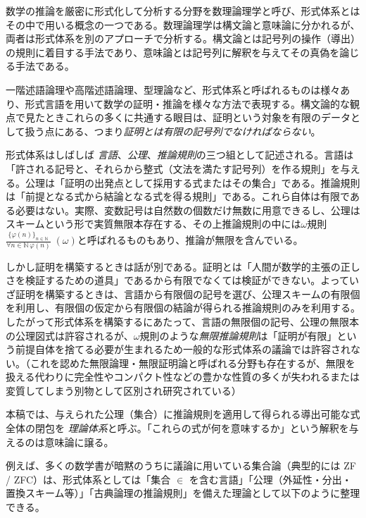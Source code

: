 \documentclass[a4paper,12pt]{bxjsbook}
\newlength{\customindent}
\newenvironment{body}{
  \par
  \begingroup
  \setlength{\leftskip}{\customindent}
  \setlength{\rightskip}{0pt}
  \setlength{\parindent}{1em}
  \setlength{\displayindent}{\customindent}
  \setlength{\displaywidth}{\dimexpr\linewidth-\customindent\relax}
}{
  \par
  \endgroup
}
\theoremstyle{theorem}
\begin{document}
    \begin{body}
        \indent 数学の推論を厳密に形式化して分析する分野を数理論理学と呼び、形式体系とはその中で用いる概念の一つである。数理論理学は構文論と意味論に分かれるが、両者は形式体系を別のアプローチで分析する。構文論とは記号列の操作（導出）の規則に着目する手法であり、意味論とは記号列に解釈を与えてその真偽を論じる手法である。

        \indent 一階述語論理や高階述語論理、型理論など、形式体系と呼ばれるものは様々あり、形式言語を用いて数学の証明・推論を様々な方法で表現する。構文論的な観点で見たときこれらの多くに共通する眼目は、証明という対象を有限のデータとして扱う点にある、つまり\emph{証明とは有限の記号列でなければならない}。
    
        \indent 形式体系はしばしば \emph{言語}、\emph{公理}、\emph{推論規則}の三つ組として記述される。言語は「許される記号と、それらから整式（文法を満たす記号列）を作る規則」を与える。公理は「証明の出発点として採用する式またはその集合」である。推論規則は「前提となる式から結論となる式を得る規則」である。これら自体は有限である必要はない。実際、変数記号は自然数の個数だけ無数に用意できるし、公理はスキームという形で実質無限本存在する、その上推論規則の中には$\omega$規則$\frac{\{\varphi(n)\}_{n\in\mathbb{N}}}{\forall n\in\mathbb{N}\,\varphi(n)}\;(\omega)$と呼ばれるものもあり、推論が無限を含んでいる。

        \indent しかし証明を構築するときは話が別である。証明とは「人間が数学的主張の正しさを検証するための道具」であるから有限でなくては検証ができない。よっていざ証明を構築するときは、言語から有限個の記号を選び、公理スキームの有限個を利用し、有限個の仮定から有限個の結論が得られる推論規則のみを利用する。したがって形式体系を構築するにあたって、言語の無限個の記号、公理の無限本の公理図式は許容されるが、$\omega$規則のような\emph{無限推論規則}は「証明が有限」という前提自体を捨てる必要が生まれるため一般的な形式体系の議論では許容されない。（これを認めた無限論理・無限証明論と呼ばれる分野も存在するが、無限を扱える代わりに完全性やコンパクト性などの豊かな性質の多くが失われるまたは変質してしまう別物として区別され研究されている）
    
        \indent 本稿では、与えられた公理（集合）に推論規則を適用して得られる導出可能な式全体の閉包を \emph{理論体系}と呼ぶ。「これらの式が何を意味するか」という解釈を与えるのは意味論に譲る。
    
        \indent 例えば、多くの数学書が暗黙のうちに議論に用いている集合論（典型的には ZF / ZFC）は、形式体系としては「集合 $\in$ を含む言語」「公理（外延性・分出・置換スキーム等）」「古典論理の推論規則」を備えた理論として以下のように整理できる。
        

\end{body}
\end{document}
